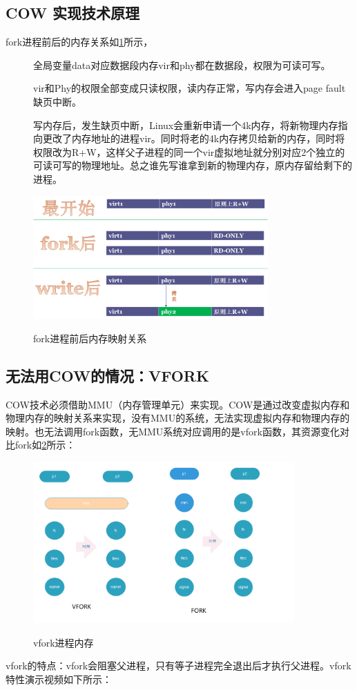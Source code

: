 \subsection{COW 实现技术原理}
fork进程前后的内存关系如\ref{linux_fork_mem_compare}所示，
\begin{description}
  \item[] 全局变量data对应数据段内存vir和phy都在数据段，权限为可读可写。
  \item[] vir和Phy的权限全部变成只读权限，读内存正常，写内存会进入page fault缺页中断。
  \item[] 写内存后，发生缺页中断，Linux会重新申请一个4k内存，将新物理内存指向更改了内存地址的进程vir。同时将老的4k内存拷贝给新的内存，同时将权限改为R+W，这样父子进程的同一个vir虚拟地址就分别对应2个独立的可读可写的物理地址。总之谁先写谁拿到新的物理内存，原内存留给剩下的进程。
\end{description}
\begin{figure}[H]
 \wdfigbox
  {\caption{fork进程前后内存映射关系}\label{linux_fork_mem_compare}}
  {
  \includegraphics[width=9cm]{./figure/cow_fork_virmem_compare.png}
  }
\end{figure}
\subsection{无法用COW的情况：VFORK}
COW技术必须借助MMU（内存管理单元）来实现。COW是通过改变虚拟内存和物理内存的映射关系来实现，没有MMU的系统，无法实现虚拟内存和物理内存的映射。也无法调用fork函数，无MMU系统对应调用的是vfork函数，其资源变化对比fork如\ref{vfork_mem}所示：
\begin{figure}[H]
 \wdfigbox
  {\caption{vfork进程内存}\label{vfork_mem}}
  {
  \includegraphics[width=10cm]{./figure/vfork_mem.png}
  }
\end{figure}
vfork的特点：vfork会阻塞父进程，只有等子进程完全退出后才执行父进程。vfork特性演示视频如下所示：

